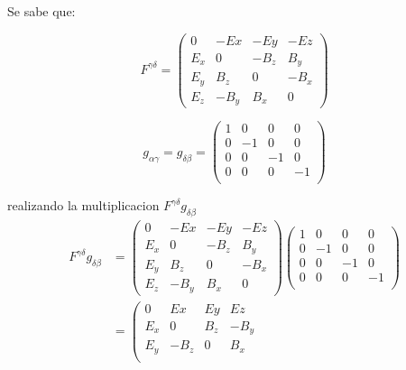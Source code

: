 \documentclass[12pt,letterpaper]{report}
\begin{document}
\begin{enumerate}
    Se sabe que:\\
    \begin{minipage}{0.5\linewidth}
    \begin{equation*}
        F^{\gamma \delta} = \left( \begin{matrix}
            0 & -Ex & -Ey   & -Ez \\
            E_x &  0  & -B_z & B_y \\
            E_y & B_z & 0 &-B_x \\
            E_z & -B_y & B_x & 0  
        \end{matrix}\right)
    \end{equation*}
\end{minipage}
\begin{minipage}{0.5\linewidth}
\begin{equation*}
    g_{\alpha \gamma} = g_{\delta \beta} =\left(\begin{matrix}
        1 & 0 & 0 & 0\\
        0 & -1 & 0 & 0\\
        0 & 0 & -1 & 0\\
        0 & 0 & 0 & -1\\
    \end{matrix}\right)
\end{equation*}
\end{minipage}
realizando la multiplicacion $F^{\gamma \delta}g_{\delta \beta }$
\begin{align*}
    F^{\gamma \delta}g_{\delta \beta }&= \left( \begin{matrix}
        0 & -Ex & -Ey   & -Ez \\
        E_x &  0  & -B_z & B_y \\
        E_y & B_z & 0 &-B_x \\
        E_z & -B_y & B_x & 0  
    \end{matrix}\right)\left(\begin{matrix}
        1 & 0 & 0 & 0\\
        0 & -1 & 0 & 0\\
        0 & 0 & -1 & 0\\
        0 & 0 & 0 & -1\\
    \end{matrix}\right)\\
    & =\left( \begin{matrix}
        0 & Ex & Ey   & Ez \\
        E_x &  0  & B_z & -B_y \\
        E_y & -B_z & 0 &B_x \\

\end{matrix}
\end{align*}
\end{enumerate}
\end{document}
